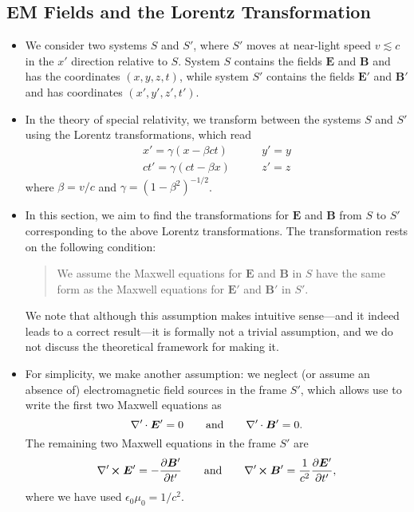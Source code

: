 \documentclass[11pt, a4paper]{article}
\newcommand{\eqtext}[1]{\qquad \text{#1} \qquad}
\renewcommand{\vec}[1]{\bm{#1}} %
\newcommand{\E}{\vec{E}} %
\newcommand{\B}{\vec{B}} %
\newcommand{\ee}{\epsilon_{0}}  %
\newcommand{\mm}{\mu_{0}}  %
\newcommand{\divp}{\nabla' \mspace{-1mu} \cdot}  %
\newcommand{\curlp}{\nabla' \mspace{-2mu} \cross}
\begin{document}
\subsection{EM Fields and the Lorentz Transformation}
\begin{itemize}
	\item We consider two systems $ S $ and $ S' $, where $ S' $  moves at near-light speed $ v \lesssim c $ in the $ x' $ direction relative to $ S $. System $ S $ contains the fields $ \E $ and $ \B $ and has the coordinates $ (x, y, z, t) $, while system $ S' $ contains the fields $ \E' $ and $ \B' $ and has coordinates $ (x', y', z', t') $.
	
	\item In the theory of special relativity, we transform between the systems $ S $ and $ S' $ using the Lorentz transformations, which read
    \begin{equation*}
        \begin{array}{cc}
            x' = \gamma(x - \beta ct) & \qquad y' = y \\
            ct' = \gamma(ct - \beta x) & \qquad z' = z
        \end{array}
    \end{equation*}
    where $ \beta = v/c $ and $ \gamma = \left( 1 - \beta^{2} \right)^{-1/2} $.
	
	\item In this section, we aim to find the transformations for $ \E $ and $ \B $ from $ S $ to $ S' $ corresponding to the above Lorentz transformations. The transformation rests on the following condition:
    \begin{quote}
        We assume the Maxwell equations for $ \E $ and $ \B $ in $ S $ have the same form as the Maxwell equations for $ \E' $ and $ \B' $ in $ S' $.
    \end{quote}
    We note that although this assumption makes intuitive sense---and it indeed leads to a correct result---it is formally not a trivial assumption, and we do not discuss the theoretical framework for making it.
	
    \item For simplicity, we make another assumption: we neglect (or assume an absence of) electromagnetic field sources in the frame $ S' $, which allows use to write the first two Maxwell equations as
    \begin{equation*}
        \divp \E' = 0 \qquad \text{and} \qquad \divp \B' = 0.
    \end{equation*}
    The remaining two Maxwell equations in the frame $ S' $ are
	\begin{equation*}
		\curlp \E' = - \pdv{\B'}{t'}  \eqtext{and} \curlp \B' = \frac{1}{c^{2}}\pdv{\E'}{t'},
	\end{equation*}
    where we have used $ \ee \mm = 1 / c^{2} $. 


\end{itemize}
\end{document}
